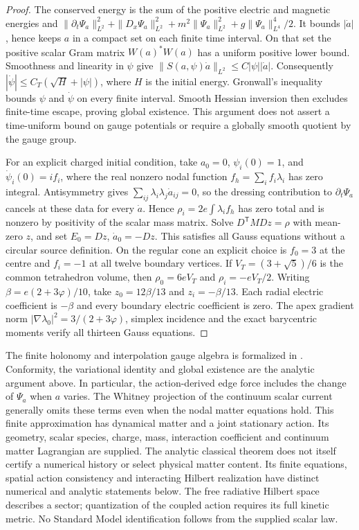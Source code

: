 \begin{proof}
The conserved energy is the sum of the positive electric and magnetic
energies and \(\|\partial_t\Psi_a\|_{L^2}^2+
\|D_x\Psi_a\|_{L^2}^2+m^2\|\Psi_a\|_{L^2}^2+
g\|\Psi_a\|_{L^4}^4/2\). It bounds \(|\dot a|\), hence
keeps \(a\) in a compact set on each finite time interval.
On that set the positive scalar Gram matrix \(W(a)^*W(a)\) has a
uniform positive lower bound. Smoothness and linearity in \(\psi\)
give \(\|S(a,\psi)\dot a\|_{L^2}\leq C|\psi||\dot a|\).
Consequently \(|\dot\psi|\leq C_T(\sqrt H+|\psi|)\), where
\(H\) is the initial energy. Gronwall's inequality bounds \(\psi\)
and \(\dot\psi\) on every finite interval. Smooth Hessian inversion
then excludes finite-time escape, proving global existence. This argument
does not assert a time-uniform bound on gauge potentials or require a
globally smooth quotient by the gauge group.

For an explicit charged initial condition, take \(a_0=0\),
\(\psi_i(0)=1\), and \(\dot\psi_i(0)=if_i\), where the real
nonzero nodal function \(f_h=\sum_i f_i\lambda_i\) has zero
integral. Antisymmetry gives
\(\sum_{ij}\lambda_i\lambda_j\dot a_{ij}=0\), so the
dressing contribution to \(\partial_t\Psi_a\) cancels at these
data for every \(\dot a\). Hence
\(\rho_i=2e\int\lambda_i f_h\) has zero total and is nonzero
by positivity of the scalar mass matrix. Solve
\(D^{\mathsf T}MDz=\rho\) with mean-zero \(z\), and set
\(E_0=Dz\), \(\dot a_0=-Dz\). This satisfies all Gauss equations
without a circular source definition.
On the regular cone an explicit choice is \(f_0=3\) at the centre and
\(f_i=-1\) at all twelve boundary vertices. If
\(V_T=(3+\sqrt5)/6\) is the common tetrahedron volume, then
\(\rho_0=6eV_T\) and \(\rho_i=-eV_T/2\).
Writing \(\beta=e(2+3\varphi)/10\), take
\(z_0=12\beta/13\) and \(z_i=-\beta/13\).
Each radial electric coefficient is \(-\beta\) and every boundary
electric coefficient is zero. The apex gradient norm
\(|\nabla\lambda_0|^2=3/(2+3\varphi)\), simplex incidence and
the exact barycentric moments verify all thirteen Gauss equations.
\end{proof}

The finite holonomy and interpolation gauge algebra is formalized in
. Conformity, the variational
identity and global existence are the analytic argument above. In
particular, the action-derived edge force includes the change of
\(\Psi_a\) when \(a\) varies. The Whitney projection of the continuum
scalar current generally omits these terms even when the nodal matter
equations hold. This finite approximation has dynamical
matter and a joint stationary action. Its geometry, scalar species, charge,
mass, interaction coefficient and continuum matter Lagrangian are supplied.
The analytic classical theorem does not itself certify a numerical history
or select physical matter content. Its finite equations, spatial action
consistency and interacting Hilbert realization have distinct numerical and
analytic statements below. The free radiative Hilbert space describes a
sector; quantization of the coupled action requires its full kinetic metric.
No Standard Model identification follows from the supplied scalar law.
